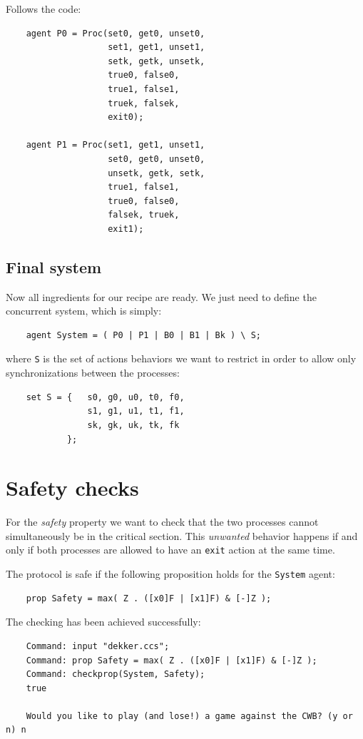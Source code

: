 \documentclass[10pt,a4paper]{article}
\newcommand{\CCSCode}[1]{{\tt #1}}
\begin{document}
            Follows the code:
            \begin{verbatim}
    agent P0 = Proc(set0, get0, unset0,
                    set1, get1, unset1,
                    setk, getk, unsetk,
                    true0, false0,
                    true1, false1,
                    truek, falsek,
                    exit0);

    agent P1 = Proc(set1, get1, unset1,
                    set0, get0, unset0,
                    unsetk, getk, setk,
                    true1, false1,
                    true0, false0,
                    falsek, truek,
                    exit1);
        \end{verbatim}

    \subsection{Final system}

        Now all ingredients for our recipe are ready. We just need to
        define the concurrent system, which is simply:
        \begin{verbatim}
    agent System = ( P0 | P1 | B0 | B1 | Bk ) \ S;
        \end{verbatim}
        where \CCSCode{S} is the set of actions behaviors we want to
        restrict in order to allow only synchronizations between the
        processes:
        \begin{verbatim}
    set S = {   s0, g0, u0, t0, f0,
                s1, g1, u1, t1, f1,
                sk, gk, uk, tk, fk
            };
        \end{verbatim}

\section{Safety checks}

    For the \emph{safety} property we want to check that the two
    processes cannot simultaneously be in the critical section.
    This \emph{unwanted} behavior happens if and only if both
    processes are allowed to have an \CCSCode{exit} action at the same
    time.

    The protocol is safe if the following proposition holds for the
    \CCSCode{System} agent:
    \begin{verbatim}
    prop Safety = max( Z . ([x0]F | [x1]F) & [-]Z );
    \end{verbatim}

    The checking has been achieved successfully:
    \begin{verbatim}
    Command: input "dekker.ccs";
    Command: prop Safety = max( Z . ([x0]F | [x1]F) & [-]Z );
    Command: checkprop(System, Safety);
    true

    Would you like to play (and lose!) a game against the CWB? (y or n) n
    \end{verbatim}
\end{document}
